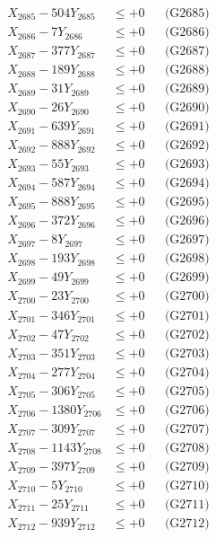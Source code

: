 \documentclass[a4paper,10pt]{article}
\begin{document}
{\begin{align}
X_{2685} - 504Y_{2685} &\leq +0 && \text{(G2685)} \\
X_{2686} - 7Y_{2686} &\leq +0 && \text{(G2686)} \\
X_{2687} - 377Y_{2687} &\leq +0 && \text{(G2687)} \\
X_{2688} - 189Y_{2688} &\leq +0 && \text{(G2688)} \\
X_{2689} - 31Y_{2689} &\leq +0 && \text{(G2689)} \\
X_{2690} - 26Y_{2690} &\leq +0 && \text{(G2690)} \\
\allowbreak
X_{2691} - 639Y_{2691} &\leq +0 && \text{(G2691)} \\
X_{2692} - 888Y_{2692} &\leq +0 && \text{(G2692)} \\
X_{2693} - 55Y_{2693} &\leq +0 && \text{(G2693)} \\
X_{2694} - 587Y_{2694} &\leq +0 && \text{(G2694)} \\
X_{2695} - 888Y_{2695} &\leq +0 && \text{(G2695)} \\
X_{2696} - 372Y_{2696} &\leq +0 && \text{(G2696)} \\
X_{2697} - 8Y_{2697} &\leq +0 && \text{(G2697)} \\
X_{2698} - 193Y_{2698} &\leq +0 && \text{(G2698)} \\
X_{2699} - 49Y_{2699} &\leq +0 && \text{(G2699)} \\
X_{2700} - 23Y_{2700} &\leq +0 && \text{(G2700)} \\
\allowbreak
X_{2701} - 346Y_{2701} &\leq +0 && \text{(G2701)} \\
X_{2702} - 47Y_{2702} &\leq +0 && \text{(G2702)} \\
X_{2703} - 351Y_{2703} &\leq +0 && \text{(G2703)} \\
X_{2704} - 277Y_{2704} &\leq +0 && \text{(G2704)} \\
X_{2705} - 306Y_{2705} &\leq +0 && \text{(G2705)} \\
X_{2706} - 1380Y_{2706} &\leq +0 && \text{(G2706)} \\
X_{2707} - 309Y_{2707} &\leq +0 && \text{(G2707)} \\
X_{2708} - 1143Y_{2708} &\leq +0 && \text{(G2708)} \\
X_{2709} - 397Y_{2709} &\leq +0 && \text{(G2709)} \\
X_{2710} - 5Y_{2710} &\leq +0 && \text{(G2710)} \\
\allowbreak
X_{2711} - 25Y_{2711} &\leq +0 && \text{(G2711)} \\
X_{2712} - 939Y_{2712} &\leq +0 && \text{(G2712)} \\

\end{align}}
\end{document}
